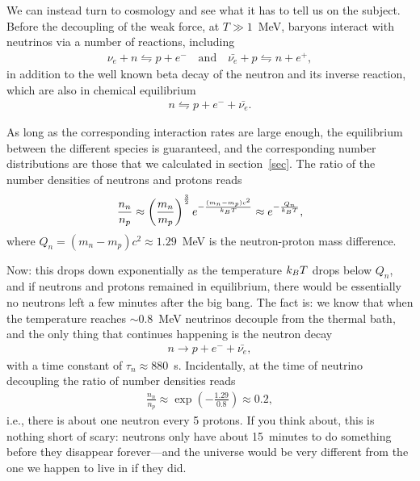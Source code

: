 We can instead turn to cosmology and see what it has to tell us on the subject.
Before the decoupling of the weak force, at $T \gg 1$~MeV, baryons interact with
neutrinos via a number of reactions, including
\begin{align*}
  \nu_e + n \leftrightharpoons p + e^- \quad\text{and}\quad
  \bar{\nu_e} + p \leftrightharpoons n + e^+,
\end{align*}
in addition to the well known beta decay of the neutron and its inverse reaction,
which are also in chemical equilibrium
\begin{align*}
  n \leftrightharpoons p + e^- + \bar{\nu_e}.
\end{align*}

As long as the corresponding interaction rates are large enough, the equilibrium
between the different species is guaranteed, and the corresponding number
distributions are those that we calculated in section~\ref{sec}. The ratio of the
number densities of neutrons and protons reads
\begin{align}\label{eq:np_ratio}
  \frac{n_n}{n_p} \approx
  \left( \frac{m_n}{m_p} \right)^\frac{3}{2} e^{-\frac{(m_n - m_p)c^2}{k_B T}}
  \approx e^{-\frac{Q_n}{k_B T}},
\end{align}
where $Q_n = (m_n - m_p)c^2 \approx 1.29$~MeV is the neutron-proton mass difference.

Now: this drops down exponentially as the temperature $k_B T$ drops below
$Q_n$,
and if neutrons and protons remained in equilibrium, there would be essentially no
neutrons left a few minutes after the big bang. The fact is: we know that when the
temperature reaches $\sim 0.8$~MeV neutrinos decouple from the thermal bath, and
the only thing that continues happening is the neutron decay
\begin{align*}
  n \rightarrow p + e^- + \bar{\nu_e},
\end{align*}
with a time constant of $\tau_n \approx 880$~s. Incidentally, at the time of neutrino
decoupling the ratio of number densities reads
\begin{align*}
  \frac{n_n}{n_p} \approx \exp\left(-\frac{1.29}{0.8}\right) \approx 0.2,
\end{align*}
i.e., there is about one neutron every 5 protons. If you think about, this is nothing
short of scary: neutrons only have about 15~minutes to do something before they
disappear forever---and the universe would be very different from the one we happen
to live in if they did.

